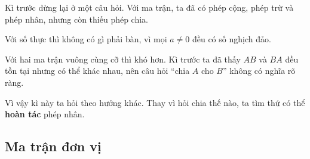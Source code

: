 \documentclass[12pt,a4paper]{article}
\begin{document}
Kì trước dừng lại ở một câu hỏi. Với ma trận, ta đã có phép cộng, phép trừ và phép nhân, nhưng còn thiếu phép chia.

Với số thực thì không có gì phải bàn, vì mọi \(a\neq0\) đều có số nghịch đảo.

Với hai ma trận vuông cùng cỡ thì khó hơn. Kì trước ta đã thấy \(AB\) và \(BA\) đều tồn tại nhưng có thể khác nhau, nên câu hỏi ``chia \(A\) cho \(B\)'' không có nghĩa rõ ràng.

Vì vậy kì này ta hỏi theo hướng khác. Thay vì hỏi chia thế nào, ta tìm thứ có thể \textbf{hoàn tác} phép nhân.

\subsection{Ma trận đơn vị}
\end{document}
